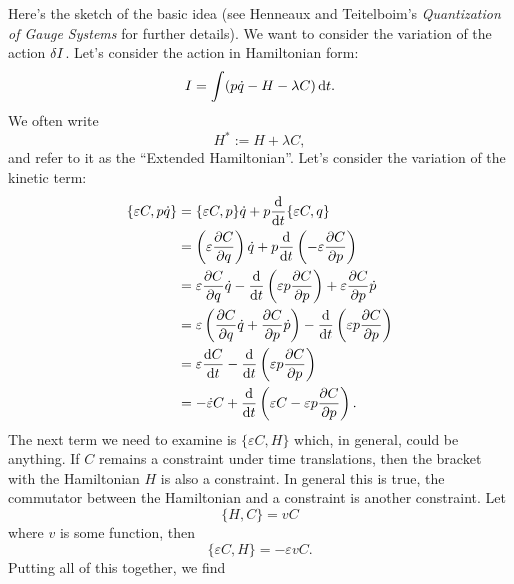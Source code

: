 Here's the sketch of the basic idea (see Henneaux and Teitelboim's
\emph{Quantization of Gauge Systems} for further details). We want to
consider the variation of the action $\delta I$. Let's consider the
action in Hamiltonian form:
\begin{equation}
I = \int(p\dot{q} - H -\lambda C)\,\mathrm{d} t.
\end{equation}
We often write
\begin{equation}
H^{*} := H + \lambda C,
\end{equation}
and refer to it as the ``Extended Hamiltonian''. Let's consider the
variation of the kinetic term:
\begin{subequations}
  \begin{align}
    \{\varepsilon C,p\dot{q}\}
    &=\{\varepsilon C,p\}\dot{q} + p\frac{\mathrm{d}}{\mathrm{d} t}\{\varepsilon C,q\}\\
    &=\left(\varepsilon \frac{\partial C}{\partial q}\right)\dot{q}
       +p\frac{\mathrm{d}}{\mathrm{d} t}\left(-\varepsilon\frac{\partial C}{\partial p}\right)\\
    &= \varepsilon \frac{\partial C}{\partial q}\dot{q}
       -\frac{\mathrm{d}}{\mathrm{d} t}\left(\varepsilon p\frac{\partial C}{\partial p}\right)
       +\varepsilon\frac{\partial C}{\partial p}\dot{p}\\
    &= \varepsilon \left(\frac{\partial C}{\partial q}\dot{q}+\frac{\partial C}{\partial p}\dot{p}\right)
       -\frac{\mathrm{d}}{\mathrm{d} t}\left(\varepsilon p\frac{\partial C}{\partial p}\right)\\
    &= \varepsilon \frac{\mathrm{d} C}{\mathrm{d} t}
       -\frac{\mathrm{d}}{\mathrm{d} t}\left(\varepsilon p\frac{\partial C}{\partial p}\right)\\
    &= -\dot{\varepsilon}C
       +\frac{\mathrm{d}}{\mathrm{d} t}\left(\varepsilon C - \varepsilon p\frac{\partial C}{\partial p}\right).
  \end{align}
\end{subequations}
The next term we need to examine is $\{\varepsilon C,H\}$ which, in
general, could be anything. If $C$ remains a constraint under time
translations, then the bracket with the Hamiltonian $H$ is also a
constraint. In general this is true, the commutator between the
Hamiltonian and a constraint is another constraint. Let
\begin{equation}
\{H,C\}=vC
\end{equation}
where $v$ is some function, then
\begin{equation}
\{\varepsilon C,H\} = -\varepsilon vC.
\end{equation}
Putting all of this together, we find
